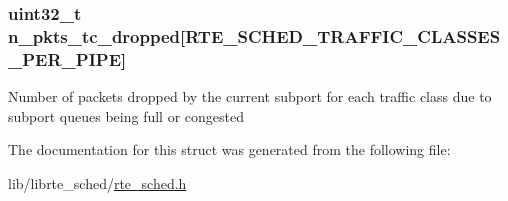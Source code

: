 \subsubsection[{n\+\_\+pkts\+\_\+tc\+\_\+dropped}]{\setlength{\rightskip}{0pt plus 5cm}uint32\+\_\+t n\+\_\+pkts\+\_\+tc\+\_\+dropped\mbox{[}{\bf R\+T\+E\+\_\+\+S\+C\+H\+E\+D\+\_\+\+T\+R\+A\+F\+F\+I\+C\+\_\+\+C\+L\+A\+S\+S\+E\+S\+\_\+\+P\+E\+R\+\_\+\+P\+I\+P\+E}\mbox{]}}\label{structrte__sched__subport__stats_ad5b91fa708c8df9e3690aaa8a32c787b}
Number of packets dropped by the current subport for each traffic class due to subport queues being full or congested 

The documentation for this struct was generated from the following file\+:\begin{DoxyCompactItemize}
\item 
lib/librte\+\_\+sched/\hyperlink{rte__sched_8h}{rte\+\_\+sched.\+h}\end{DoxyCompactItemize}
